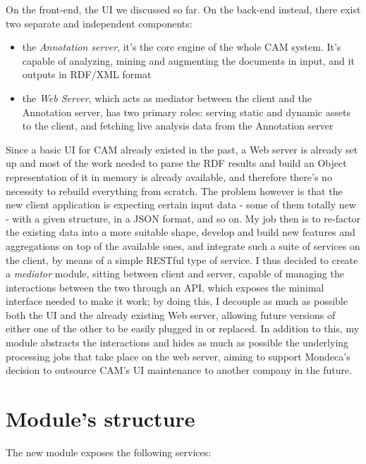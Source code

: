 \documentclass[12pt,svgnames]{memoir}
\begin{document}
On the front-end, the UI we discussed so far. On the back-end instead,
there exist two separate and independent components:

\begin{itemize}
\itemsep1pt\parskip0pt
\item
  the \emph{Annotation server}, it's the core engine of the whole CAM
  system. It's capable of analyzing, mining and augmenting the documents
  in input, and it outputs in RDF/XML format
\item
  the \emph{Web Server}, which acts as mediator between the client and
  the Annotation server, has two primary roles: serving static and
  dynamic assets to the client, and fetching live analysis data from the
  Annotation server
\end{itemize}

Since a basic UI for CAM already existed in the past, a Web server is
already set up and most of the work needed to parse the RDF results and
build an Object representation of it in memory is already available, and
therefore there's no necessity to rebuild everything from scratch. The
problem however is that the new client application is expecting certain
input data - some of them totally new - with a given structure, in a
JSON format, and so on. My job then is to re-factor the existing data
into a more suitable shape, develop and build new features and
aggregations on top of the available ones, and integrate such a suite of
services on the client, by means of a simple RESTful type of service. I
thus decided to create a \emph{mediator} module, sitting between client
and server, capable of managing the interactions between the two through
an API, which exposes the minimal interface needed to make it work; by
doing this, I decouple as much as possible both the UI and the already
existing Web server, allowing future versions of either one of the other
to be easily plugged in or replaced. In addition to this, my module
abstracts the interactions and hides as much as possible the underlying
processing jobs that take place on the web server, aiming to support
Mondeca's decision to outsource CAM's UI maintenance to another company
in the future.

\section{Module's structure}\label{modules-structure}

The new module exposes the following services:
\end{document}
